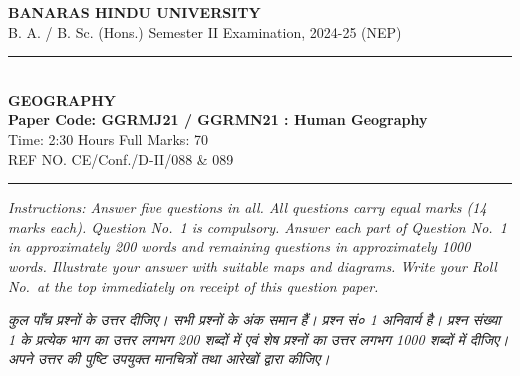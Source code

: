 \documentclass[11pt,a4paper]{article}
\begin{document}
\begin{center}
  {\large\bfseries BANARAS HINDU UNIVERSITY}\\[2pt]
  {\normalsize B. A. / B. Sc. (Hons.) Semester II Examination, 2024-25 (NEP)}\\[6pt]
  \rule{0.8\linewidth}{0.5pt}\\[6pt]
  {\large\bfseries GEOGRAPHY}\\[4pt]
  {\large\bfseries Paper Code: GGRMJ21 / GGRMN21 : Human Geography}\\[4pt]
  {\normalsize Time: 2:30 Hours \hfill Full Marks: 70}\\[2pt]
  {\small REF NO. CE/Conf./D-II/088 \& 089}
\end{center}
\rule{\linewidth}{0.4pt}
\smallskip

\noindent \textit{Instructions: Answer five questions in all. All questions carry equal marks (14 marks each). Question No.\ 1 is compulsory. Answer each part of Question No.\ 1 in approximately 200 words and remaining questions in approximately 1000 words. Illustrate your answer with suitable maps and diagrams. Write your Roll No.\ at the top immediately on receipt of this question paper.}

\smallskip
\noindent \textit{कुल पाँच प्रश्नों के उत्तर दीजिए। सभी प्रश्नों के अंक समान हैं। प्रश्न सं० 1 अनिवार्य है। प्रश्न संख्या 1 के प्रत्येक भाग का उत्तर लगभग 200 शब्दों में एवं शेष प्रश्नों का उत्तर लगभग 1000 शब्दों में दीजिए। अपने उत्तर की पुष्टि उपयुक्त मानचित्रों तथा आरेखों द्वारा कीजिए।}

\bigskip
\end{document}
